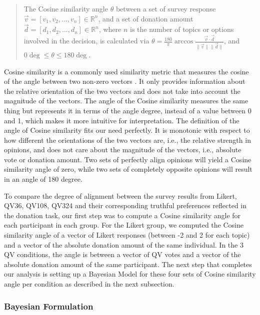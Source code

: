 \begin{quote}
    The Cosine similarity angle $\theta$ between a set of survey response $\vec{v} = [v_1, v_2, ..., v_n] \in \mathbb{R}^n$, and a set of donation amount $\vec{d} = [d_1, d_2, ..., d_n] \in \mathbb{R}^n$, where $n$ is the number of topics or options involved in the decision, is calculated via $\theta = \frac{180}{\pi} \arccos{\frac{\vec{v} \cdot \vec{d}}{\|\vec{v}\| \|\vec{d}\|}}$, and $0\deg \leq \theta \leq 180\deg$.
\end{quote}

Cosine similarity is a commonly used similarity metric that measures the cosine of the angle between two non-zero vectors \cite{singhal2001modern}. It only provides information about the relative orientation of the two vectors and does not take into account the magnitude of the vectors. The angle of the Cosine similarity measures the same thing but represents it in terms of the angle degree, instead of a value between 0 and 1, which makes it more intuitive for interpretation. The definition of the angle of Cosine similarity fits our need perfectly. It is monotonic with respect to how different the orientations of the two vectors are, i.e., the relative strength in opinions, and does not care about the magnitude of the vectors, i.e., absolute vote or donation amount. Two sets of perfectly align opinions will yield a Cosine similarity angle of zero, while two sets of completely opposite opinions will result in an angle of 180 degree.

To compare the degree of alignment between the survey results from Likert, QV36, QV108, QV324 and their corresponding truthful preferences reflected in the donation task, our first step was to compute a Cosine similarity angle for each participant in each group. For the Likert group, we computed the Cosine similarity angle of a vector of Likert responses (between -2 and 2 for each topic) and a vector of the absolute donation amount of the same individual. In the 3 QV conditions, the angle is between a vector of QV votes and a vector of the absolute donation amount of the same participant. The next step that completes our analysis is setting up a Bayesian Model for these four sets of Cosine similarity angle per condition as described in the next subsection.


\subsubsection{Bayesian Formulation}

